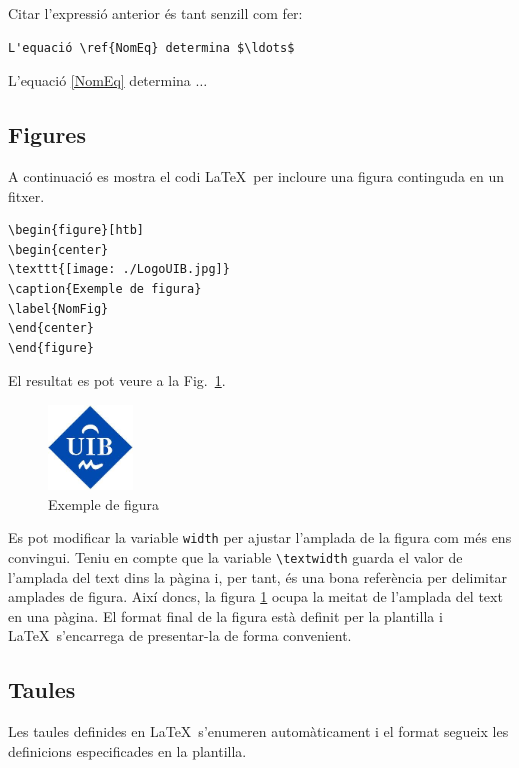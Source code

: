 Citar l'expressió anterior és tant senzill com fer:
\begin{verbatim}
L'equació \ref{NomEq} determina $\ldots$
\end{verbatim}
L'equació \ref{NomEq} determina $\ldots$

\subsection{Figures}

A continuació es mostra el codi \LaTeX\ per incloure una figura continguda en un fitxer.

\begin{verbatim}
\begin{figure}[htb]
\begin{center}
\texttt{[image: ./LogoUIB.jpg]}
\caption{Exemple de figura}
\label{NomFig}
\end{center}
\end{figure}
\end{verbatim}
El resultat es pot veure a la Fig.~\ref{NomFig}.

\begin{figure}[htb]
\begin{center}
\includegraphics[width=0.2\textwidth]{./Imagenes/LogoUIB.jpg}
\caption{Exemple de figura}
\label{NomFig}
\end{center}
\end{figure}

Es pot modificar la variable \texttt{width} per ajustar l'amplada de la figura com més ens convingui. Teniu en compte que la variable
\texttt{\textbackslash textwidth} guarda el valor de l'amplada del text dins la pàgina i, per tant, és una bona referència per delimitar amplades de figura. Així doncs, la figura \ref{NomFig} ocupa la meitat de l'amplada del text en una pàgina. El format final de la figura està definit per la
plantilla i \LaTeX\ s'encarrega de presentar-la de forma convenient.

\subsection{Taules}

Les taules definides en \LaTeX\ s'enumeren automàticament i el format segueix les definicions especificades en la plantilla.

